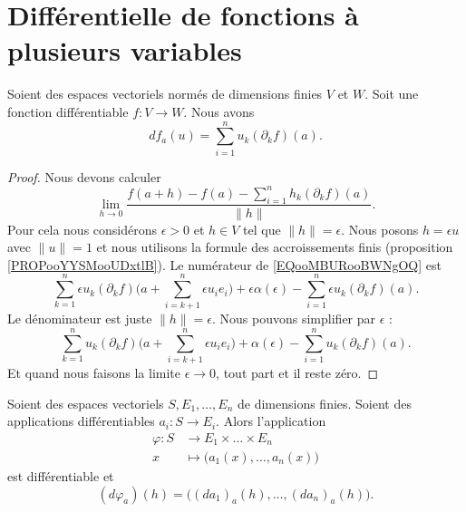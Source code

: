 \section{Différentielle de fonctions à plusieurs variables}


\begin{proposition}	\label{PROPooPRDIooNYOesw}
	Soient des espaces vectoriels normés de dimensions finies \( V\) et \( W\). Soit une fonction différentiable \(f \colon V\to W  \). Nous avons
	\begin{equation}
		df_a(u)=\sum_{i=1}^nu_k(\partial_kf)(a).
	\end{equation}
\end{proposition}

\begin{proof}
	Nous devons calculer
	\begin{equation}		\label{EQooMBURooBWNgOQ}
		\lim_{h\to 0} \frac{ f(a+h)-f(a)-\sum_{i=1}^nh_k(\partial_kf)(a) }{ \| h \| }.
	\end{equation}
	Pour cela nous considérons \( \epsilon>0\) et \( h\in V\) tel que \( \| h \|=\epsilon\). Nous posons \( h=\epsilon u\) avec \( \| u \|=1\) et nous utilisons la formule des accroissements finis (proposition \ref{PROPooYYSMooUDxtlB}). Le numérateur de \eqref{EQooMBURooBWNgOQ} est
	\begin{equation}
		\sum_{k=1}^n\epsilon u_k(\partial_kf)\big( a+\sum_{i=k+1}^n\epsilon u_ie_i \big)+\epsilon\alpha(\epsilon)-\sum_{i=1}^n\epsilon u_k(\partial_kf)(a).
	\end{equation}
	Le dénominateur est juste \( \| h \|=\epsilon \). Nous pouvons simplifier par \( \epsilon\) :
	\begin{equation}
		\sum_{k=1}^nu_k(\partial_kf)\big( a+\sum_{i=k+1}^n\epsilon u_i e_i \big)+\alpha(\epsilon)-\sum_{i=1}^nu_k(\partial_kf)(a).
	\end{equation}
	Et quand nous faisons la limite \( \epsilon\to 0\), tout part et il reste zéro.
\end{proof}

\begin{proposition}	\label{PROPooCAZBooJZKXod}
	Soient des espaces vectoriels \( S,E_1,\ldots,E_n\) de dimensions finies. Soient des applications différentiables \(a_i \colon S\to  E_i \). Alors l'application
	\begin{equation}
		\begin{aligned}
			\varphi\colon S & \to E_1\times \ldots\times E_n           \\
			x               & \mapsto \big( a_1(x),\ldots,a_n(x) \big)
		\end{aligned}
	\end{equation}
	est différentiable et
	\begin{equation}
		(d\varphi_a)(h)=\Big( (da_1)_a(h),\ldots,(da_n)_a(h) \Big).
	\end{equation}
\end{proposition}

